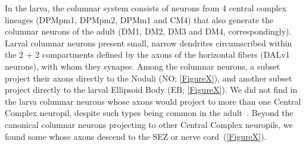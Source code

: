 \documentclass{article}
\begin{document}







In the larva, the columnar system consists of neurons from 4 central complex lineages (DPMpm1, DPMpm2, DPMm1 and CM4) that also generate the columnar neurons of the adult (DM1, DM2, DM3 and DM4, correspondingly).
Larval columnar neurons present small, narrow dendrites circumscribed within the 2 + 2 compartments defined by the axons of the horizontal fibers (DALv1 neurons), with whom they synapse.
Among the columnar neurons, a subset project their axons directly to the Noduli (NO; \ref{FigureX}), and another subset project directly to the larval Ellipsoid Body (EB; \ref{FigureX}).
We did not find in the larva columnar neurons whose axons would project to more than one Central Complex neuropil, despite such types being common in the adult~\citep{wolff2015neuroarchitecture; wolff2018; hulse2021connectome}.
Beyond the canonical columnar neurons projecting to other Central Complex neuropils, we found some whose axons descend to the SEZ or nerve cord~(\ref{FigureX}).




\end{document}

